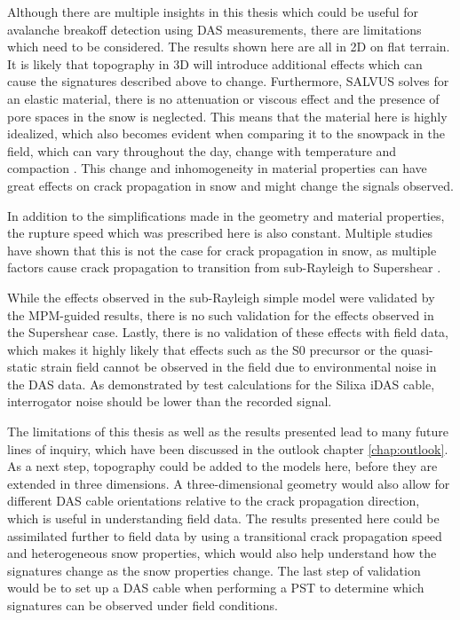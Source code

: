 Although there are multiple insights in this thesis which could be useful for avalanche breakoff detection using DAS measurements, there are limitations which need to be considered. The results shown here are all in 2D on flat terrain. It is likely that topography in 3D will introduce additional effects which can cause the signatures described above to change. Furthermore, SALVUS solves for an elastic material, there is no attenuation or viscous effect and the presence of pore spaces in the snow is neglected. This means that the material here is highly idealized, which also becomes evident when comparing it to the snowpack in the field, which can vary throughout the day, change with temperature and compaction \parencite{barteltPhysicalSNOWPACKModel2002}. This change and inhomogeneity in material properties can have great effects on crack propagation in snow \parencite{mulakNumericalInvestigationMixedmode2019,anceySnowAvalanches2001} and might change the signals observed. \par

In addition to the simplifications made in the geometry and material properties, the rupture speed which was prescribed here is also constant. Multiple studies have shown that this is not the case for crack propagation in snow, as multiple factors cause crack propagation to transition from sub-Rayleigh to Supershear \parencite{sironTheoreticalFrameworkDynamic2023}. \par

While the effects observed in the sub-Rayleigh simple model were validated by the MPM-guided results, there is no such validation for the effects observed in the Supershear case. Lastly, there is no validation of these effects with field data, which makes it highly likely that effects such as the S0 precursor or the quasi-static strain field cannot be observed in the field due to environmental noise in the DAS data. As demonstrated by test calculations for the Silixa iDAS cable, interrogator noise should be lower than the recorded signal. \par 


The limitations of this thesis as well as the results presented lead to many future lines of inquiry, which have been discussed in the outlook chapter \ref{chap:outlook}. As a next step, topography could be added to the models here, before they are extended in three dimensions. A three-dimensional geometry would also allow for different DAS cable orientations relative to the crack propagation direction, which is useful in understanding field data. The results presented here could be assimilated further to field data by using a transitional crack propagation speed and heterogeneous snow properties, which would also help understand how the signatures change as the snow properties change. The last step of validation would be to set up a DAS cable when performing a PST to determine which signatures can be observed under field conditions. \par 